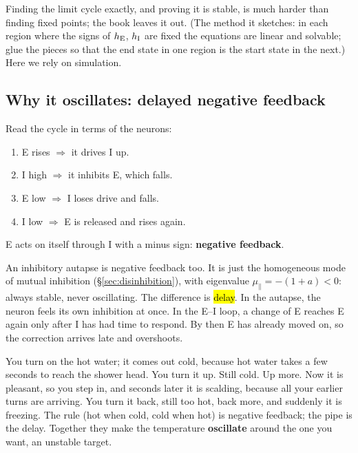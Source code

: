 \begin{pitfall}
Finding the limit cycle exactly, and proving it is stable, is much harder than finding fixed points; the book leaves it out. (The method it sketches: in each region where the signs of $h_{\mathrm{E}}$, $h_{\mathrm{I}}$ are fixed the equations are linear and solvable; glue the pieces so that the end state in one region is the start state in the next.) Here we rely on simulation.
\end{pitfall}

\subsection{Why it oscillates: delayed negative feedback}

Read the cycle in terms of the neurons:
\begin{enumerate}
  \item E rises $\Rightarrow$ it drives I up.
  \item I high $\Rightarrow$ it inhibits E, which falls.
  \item E low $\Rightarrow$ I loses drive and falls.
  \item I low $\Rightarrow$ E is released and rises again.
\end{enumerate}
E acts on itself through I with a minus sign: \textbf{negative feedback}.

\begin{intuition}
An inhibitory autapse is negative feedback too. It is just the homogeneous mode of mutual inhibition (\S\ref{sec:disinhibition}), with eigenvalue $\mu_\parallel=-(1+a)<0$: always stable, never oscillating.
The difference is \hl{delay}. In the autapse, the neuron feels its own inhibition at once. In the E--I loop, a change of E reaches E again only after I has had time to respond. By then E has already moved on, so the correction arrives late and overshoots.
\end{intuition}

\begin{example}
You turn on the hot water; it comes out cold, because hot water takes a few seconds to reach the shower head. You turn it up. Still cold. Up more. Now it is pleasant, so you step in, and seconds later it is scalding, because all your earlier turns are arriving. You turn it back, still too hot, back more, and suddenly it is freezing.
The rule (hot when cold, cold when hot) is negative feedback; the pipe is the delay. Together they make the temperature \textbf{oscillate} around the one you want, an unstable target.
\end{example}

